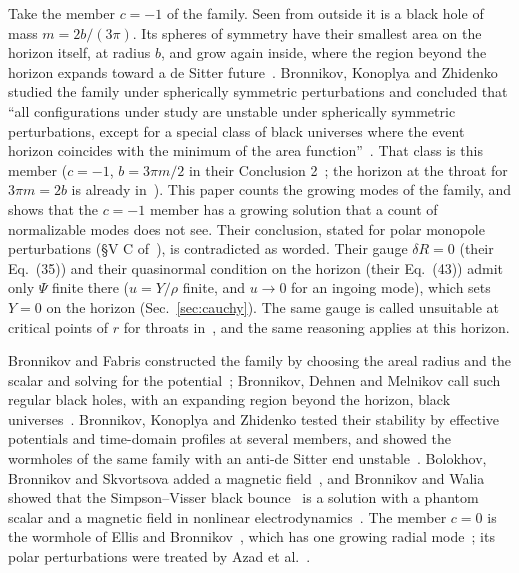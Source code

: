 \documentclass[11pt]{article}
\theoremstyle{plain}
\begin{document}
Take the member $c=-1$ of the family. Seen from outside it is a black hole of mass $m=2b/(3\pi)$. Its spheres of symmetry
have their smallest area on the horizon itself, at radius $b$, and grow again inside, where the region beyond the horizon
expands toward a de Sitter future~\cite{BF06}. Bronnikov, Konoplya and Zhidenko studied the family under spherically symmetric
perturbations and concluded that ``all configurations under study are unstable under spherically symmetric perturbations,
except for a special class of black universes where the event horizon coincides with the minimum of the area
function''~\cite{BKZ12}. That class is this member ($c=-1$, $b=3\pi m/2$ in their Conclusion 2~\cite{BKZ12}; the horizon at the throat for
$3\pi m=2b$ is already in~\cite{BF06}).
This paper counts the growing modes of the family, and shows that the $c=-1$ member has a growing solution that a count of
normalizable modes does not see. Their conclusion, stated for polar monopole perturbations (\S V C of~\cite{BKZ12}), is
contradicted as worded. Their gauge $\delta R=0$ (their Eq.~(35)) and their quasinormal condition on the horizon (their
Eq.~(43)) admit only $\Psi$ finite there ($u=Y/\rho$ finite, and $u\to0$ for an ingoing mode), which sets $Y=0$ on the
horizon (Sec.~\ref{sec:cauchy}). The same gauge is called unsuitable at critical points of $r$ for throats
in~\cite{BFZ11}, and the same reasoning applies at this horizon.

Bronnikov and Fabris constructed the family by choosing the areal radius and the scalar and solving for the
potential~\cite{BF06}; Bronnikov, Dehnen and Melnikov call such regular black holes, with an expanding region beyond the horizon, black
universes~\cite{BMD07}. Bronnikov, Konoplya and
Zhidenko tested their stability by effective potentials and time-domain profiles at several members, and showed the
wormholes of the same family with an anti-de Sitter end unstable~\cite{BKZ12}. Bolokhov, Bronnikov and Skvortsova added a
magnetic field~\cite{BBS12}, and Bronnikov and Walia showed that the Simpson--Visser black bounce~\cite{SV19} is a solution
with a phantom scalar and a magnetic field in nonlinear electrodynamics~\cite{BW22}. The member $c=0$ is the wormhole of
Ellis and Bronnikov~\cite{Ellis1973,Bronnikov1973}, which has one growing radial mode~\cite{GGS2009a}; its polar
perturbations were treated by Azad et al.~\cite{ABCKY23}.
\end{document}
